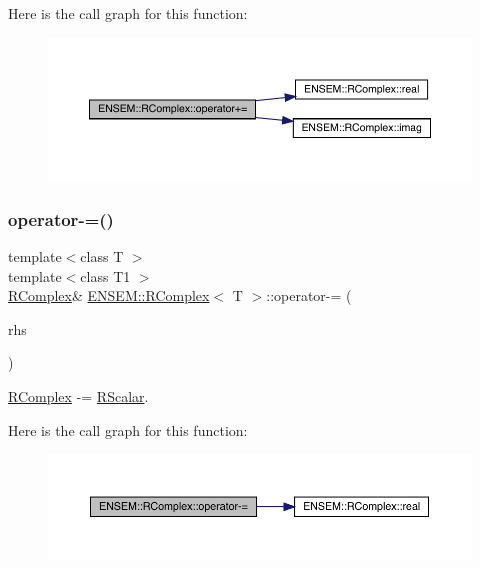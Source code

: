 Here is the call graph for this function\+:
\nopagebreak
\begin{figure}[H]
\begin{center}
\leavevmode
\includegraphics[width=350pt]{d9/d0e/classENSEM_1_1RComplex_aca53957ad00d064844898e907e6f6fab_cgraph}
\end{center}
\end{figure}
\mbox{\label{classENSEM_1_1RComplex_af071c8c8f4d2a2cf17a9e4b01accf6bc}} 
\subsubsection{\texorpdfstring{operator-\/=()}{operator-=()}\hspace{0.1cm}{\footnotesize\ttfamily [1/6]}}
{\footnotesize\ttfamily template$<$class T $>$ \\
template$<$class T1 $>$ \\
\mbox{\hyperlink{classENSEM_1_1RComplex}{R\+Complex}}\& \mbox{\hyperlink{classENSEM_1_1RComplex}{E\+N\+S\+E\+M\+::\+R\+Complex}}$<$ T $>$\+::operator-\/= (\begin{DoxyParamCaption}\item[{const \mbox{\hyperlink{classENSEM_1_1RScalar}{R\+Scalar}}$<$ T1 $>$ \&}]{rhs }\end{DoxyParamCaption})\hspace{0.3cm}{\ttfamily [inline]}}



\mbox{\hyperlink{classENSEM_1_1RComplex}{R\+Complex}} -\/= \mbox{\hyperlink{classENSEM_1_1RScalar}{R\+Scalar}}. 

Here is the call graph for this function\+:
\nopagebreak
\begin{figure}[H]
\begin{center}
\leavevmode
\includegraphics[width=350pt]{d9/d0e/classENSEM_1_1RComplex_af071c8c8f4d2a2cf17a9e4b01accf6bc_cgraph}
\end{center}
\end{figure}
\mbox{\label{classENSEM_1_1RComplex_af071c8c8f4d2a2cf17a9e4b01accf6bc}} 
